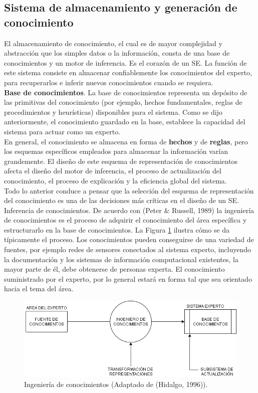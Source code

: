 \subsection{	Sistema de almacenamiento y generación de conocimiento}
El almacenamiento de conocimiento, el cual es de mayor complejidad y abstracción que los simples datos o la información, consta de una base de conocimientos y un motor de inferencia. Es el corazón de un SE. La función de este sistema consiste en almacenar confiablemente los conocimientos del experto, para recuperarlos e inferir nuevos conocimientos cuando se requiera.\\
\textbf{Base de conocimientos}. La base de conocimientos representa un depósito de las primitivas del conocimiento (por ejemplo, hechos fundamentales, reglas de procedimientos y heurísticas) disponibles para el sistema. Como se dijo anteriormente, el conocimiento guardado en la base, establece la capacidad del sistema para actuar como un experto.\\
En general, el conocimiento se almacena en forma de \textbf{hechos} y de \textbf{reglas}, pero los esquemas específicos empleados para almacenar la información varían grandemente. El diseño de este esquema de representación de conocimientos afecta el diseño del motor de inferencia, el proceso de actualización del conocimiento, el proceso de explicación y la eficiencia global del sistema.\\
Todo lo anterior conduce a pensar que la selección del esquema de representación del conocimiento es una de las decisiones más críticas en el diseño de un SE.\\
Inferencia de conocimientos. De acuerdo con (Peter \& Russell, 1989) la ingeniería de conocimientos es el proceso de adquirir el conocimiento del área específica y estructurarlo en la base de conocimientos. La Figura \ref{fig:10-2} ilustra cómo se da típicamente el proceso. Los conocimientos pueden conseguirse de una variedad de fuentes, por ejemplo redes de sensores conectados al sistema experto, incluyendo la documentación y los sistemas de información  computacional existentes, la mayor parte de él, debe obtenerse de personas experta. El conocimiento suministrado por el experto, por lo general estará en forma tal que sea orientado hacia el tema del área.
\begin{figure}[H]
\centering
\captionsetup{justification=centering,margin=2cm}
\includegraphics[scale=0.6]{chapters/chapter10/figures/1-2}
\caption{Ingeniería de conocimientos (Adaptado de (Hidalgo, 1996)).}
\label{fig:10-2}
\end{figure}
